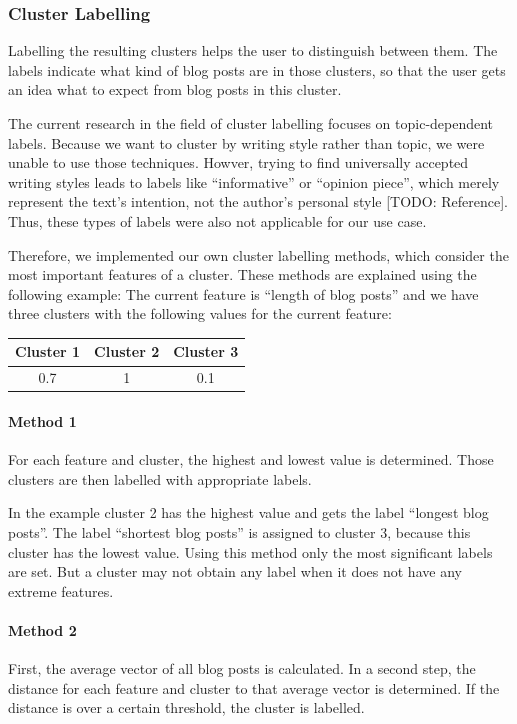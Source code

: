 
\subsubsection{Cluster Labelling}
\label{sec:cluster_labeling}
Labelling the resulting clusters helps the user to distinguish between them.
The labels indicate what kind of blog posts are in those clusters, so that the user gets an idea what to expect from blog posts in this cluster.

The current research in the field of cluster labelling focuses on topic-dependent labels.
Because we want to cluster by writing style rather than topic, we were unable to use those techniques.
Howver, trying to find universally accepted writing styles leads to labels like ``informative'' or ``opinion piece'', which merely represent the text's intention, not the author's personal style [TODO: Reference].
Thus, these types of labels were also not applicable for our use case.

Therefore, we implemented our own cluster labelling methods, which consider the most important features of a cluster.
These methods are explained using the following example:
The current feature is ``length of blog posts'' and we have three clusters with the following values for the current feature:
\begin{center}
\begin{tabular}{c|c|c}
  Cluster 1 & Cluster 2 & Cluster 3 \\ \hline
  0.7 & 1 & 0.1 \\
 \end{tabular}
\end{center}
\paragraph{Method 1}
For each feature and cluster, the highest and lowest value is determined.
Those clusters are then labelled with appropriate labels.

In the example cluster 2 has the highest value and gets the label ``longest blog posts''.
The label ``shortest blog posts'' is assigned to cluster 3, because this cluster has the lowest value.
Using this method only the most significant labels are set.
But a cluster may not obtain any label when it does not have any extreme features.

\paragraph{Method 2}
First, the average vector of all blog posts is calculated.
In a second step, the distance for each feature and cluster to that average vector is determined.
If the distance is over a certain threshold, the cluster is labelled.


